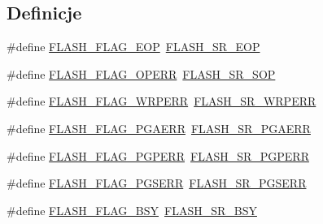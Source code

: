 \subsection*{Definicje}
\begin{DoxyCompactItemize}
\item 
\#define \hyperlink{group___f_l_a_s_h___flag__definition_gaf043ba4d8f837350bfc7754a99fae5a9}{F\+L\+A\+S\+H\+\_\+\+F\+L\+A\+G\+\_\+\+E\+OP}~\hyperlink{group___peripheral___registers___bits___definition_gae1301c6b487cfefa247c54a576a0c12b}{F\+L\+A\+S\+H\+\_\+\+S\+R\+\_\+\+E\+OP}
\item 
\#define \hyperlink{group___f_l_a_s_h___flag__definition_gad8a96ceda91fcf0d1299da933b5816f1}{F\+L\+A\+S\+H\+\_\+\+F\+L\+A\+G\+\_\+\+O\+P\+E\+RR}~\hyperlink{group___peripheral___registers___bits___definition_gab779aa8b88258e15c183041744a846ff}{F\+L\+A\+S\+H\+\_\+\+S\+R\+\_\+\+S\+OP}
\item 
\#define \hyperlink{group___f_l_a_s_h___flag__definition_ga6abf64f916992585899369166db3f266}{F\+L\+A\+S\+H\+\_\+\+F\+L\+A\+G\+\_\+\+W\+R\+P\+E\+RR}~\hyperlink{group___peripheral___registers___bits___definition_gabf6f52f59b01530928d747cf32bd4d01}{F\+L\+A\+S\+H\+\_\+\+S\+R\+\_\+\+W\+R\+P\+E\+RR}
\item 
\#define \hyperlink{group___f_l_a_s_h___flag__definition_ga2c3f4dbea065f8ea2987eada4dab30bd}{F\+L\+A\+S\+H\+\_\+\+F\+L\+A\+G\+\_\+\+P\+G\+A\+E\+RR}~\hyperlink{group___peripheral___registers___bits___definition_gac98c2458e114e7f419f3222673878ce0}{F\+L\+A\+S\+H\+\_\+\+S\+R\+\_\+\+P\+G\+A\+E\+RR}
\item 
\#define \hyperlink{group___f_l_a_s_h___flag__definition_ga88a93907641f5eeb4091a26b84c94897}{F\+L\+A\+S\+H\+\_\+\+F\+L\+A\+G\+\_\+\+P\+G\+P\+E\+RR}~\hyperlink{group___peripheral___registers___bits___definition_ga7fd2704724528be959f82089f67e3869}{F\+L\+A\+S\+H\+\_\+\+S\+R\+\_\+\+P\+G\+P\+E\+RR}
\item 
\#define \hyperlink{group___f_l_a_s_h___flag__definition_ga25b80c716320e667162846da8be09b68}{F\+L\+A\+S\+H\+\_\+\+F\+L\+A\+G\+\_\+\+P\+G\+S\+E\+RR}~\hyperlink{group___peripheral___registers___bits___definition_ga5d76ad3629a288bee0136b8b34f274f4}{F\+L\+A\+S\+H\+\_\+\+S\+R\+\_\+\+P\+G\+S\+E\+RR}
\item 
\#define \hyperlink{group___f_l_a_s_h___flag__definition_gad3bc368f954ad7744deda3315da2fff7}{F\+L\+A\+S\+H\+\_\+\+F\+L\+A\+G\+\_\+\+B\+SY}~\hyperlink{group___peripheral___registers___bits___definition_ga4b86181a96fd2f1cc3828e9d8d83d368}{F\+L\+A\+S\+H\+\_\+\+S\+R\+\_\+\+B\+SY}
\end{DoxyCompactItemize}


